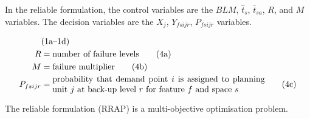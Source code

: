 \documentclass[11pt,]{article}
\begin{document}
In the reliable formulation, the control variables are the $BLM$,
$\hat{t}_{s}$, $\bar{t}_{sa}$, $R$, and $M$ variables. The decision
variables are the $X_j$, $Y_{fsijr}$, $P_{fsijr}$ variables.

\begin{align*}
& \text{(1a--1d)} \\
R &= \text{number of failure levels} \tag{4a} \\
%
M &= \text{failure multiplier} \tag{4b}\\
%
P_{fsijr} &= \parbox{25em}{probability that demand point $i$ is assigned to planning unit $j$ at back-up level $r$ for feature $f$ and space $s$} \tag{4c}\\
\end{align*}

The reliable formulation (RRAP) is a multi-objective optimisation
problem.
\end{document}
